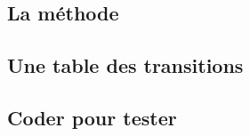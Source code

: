 \subsection{La méthode}

	


\subsection{Une table des transitions}

	


\subsection{Coder pour tester}

	
